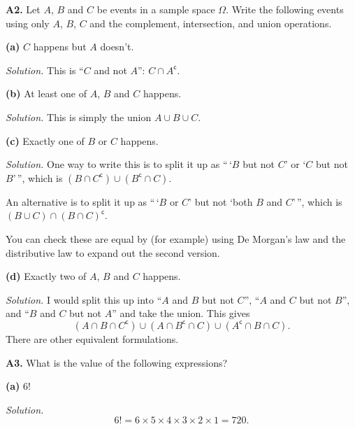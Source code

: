 \documentclass[
  a4paper,
]{book}
\theoremstyle{definition}
\theoremstyle{definition}
\theoremstyle{definition}
\theoremstyle{definition}
\theoremstyle{remark}
\begin{document}
\textbf{A2.} Let \(A\), \(B\) and \(C\) be events in a sample space \(\Omega\). Write the following events using only \(A\), \(B\), \(C\) and the complement, intersection, and union operations.

\textbf{(a)} \(C\) happens but \(A\) doesn't.

\begin{myanswers}
\emph{Solution.} This is ``\(C\) and not \(A\)'': \(C\cap A^{\mathsf{c}}\).

\end{myanswers}

\textbf{(b)} At least one of \(A\), \(B\) and \(C\) happens.

\begin{myanswers}
\emph{Solution.} This is simply the union \(A \cup B\cup C\).

\end{myanswers}

\textbf{(c)} Exactly one of \(B\) or \(C\) happens.

\begin{myanswers}
\emph{Solution.} One way to write this is to split it up as ``\,`\(B\) but not \(C\)' or `\(C\) but not \(B\)'\,'', which is \((B \cap C^{\mathsf{c}}) \cup (B^{\mathsf{c}} \cap C)\).

An alternative is to split it up as ``\,`\(B\) or \(C\)' but not `both \(B\) and \(C\)'\,'', which is \((B \cup C) \cap (B\cap C)^{\mathsf{c}}\).

You can check these are equal by (for example) using De Morgan's law and the distributive law to expand out the second version.

\end{myanswers}

\textbf{(d)} Exactly two of \(A\), \(B\) and \(C\) happens.

\begin{myanswers}
\emph{Solution.} I would split this up into ``\(A\) and \(B\) but not \(C\)'', ``\(A\) and \(C\) but not \(B\)'', and ``\(B\) and \(C\) but not \(A\)'' and take the union. This gives
\[  (A \cap B \cap C^{\mathsf{c}}) \cup (A \cap B^{\mathsf{c}} \cap C) \cup (A^{\mathsf{c}} \cap B \cap C) . \]
There are other equivalent formulations.

\end{myanswers}

\textbf{A3.} What is the value of the following expressions?

\textbf{(a)} \(6!\)

\begin{myanswers}
\emph{Solution.}
\[ 6! = 6 \times 5 \times 4 \times 3 \times 2 \times 1 = 720. \]

\end{myanswers}
\end{document}
